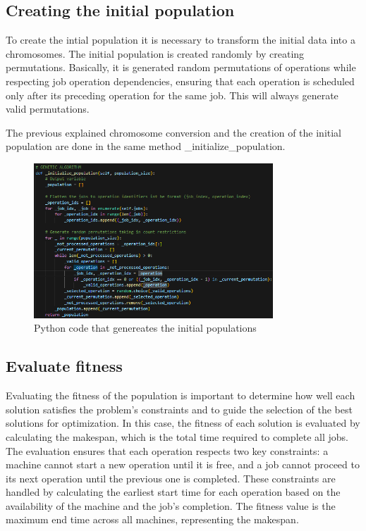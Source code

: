 \documentclass[11pt, a4paper]{article}
\begin{document}
\subsection{Creating the initial population}

To create the intial population it is necessary to transform the initial data into a chromosomes. The initial population is created randomly by creating
permutations. Basically, it is generated random permutations of operations while respecting job operation dependencies, ensuring that each operation is 
scheduled only after its preceding operation for the same job. This will always generate valid permutations.

\vspace{1em} The previous explained chromosome conversion and the creation of the initial population are done in the same method \_initialize\_population.

\begin{figure}[H]
    \centering
    \includegraphics[width=0.8\textwidth]{media/population_init.png}
    \caption{Python code that genereates the initial populations}
    \label{fig:image_2}
\end{figure}


\subsection{Evaluate fitness}

Evaluating the fitness of the population is important to determine how well each solution satisfies the problem's constraints and to guide the selection of the best 
solutions for optimization. In this case, the fitness of each solution is evaluated by calculating the makespan, which is the total time required to complete all jobs. 
The evaluation ensures that each operation respects two key constraints: a machine cannot start a new operation until it is free, and a job cannot proceed to its next 
operation until the previous one is completed. These constraints are handled by calculating the earliest start time for each operation based on the availability of 
the machine and the job's completion. The fitness value is the maximum end time across all machines, representing the makespan.
\end{document}
